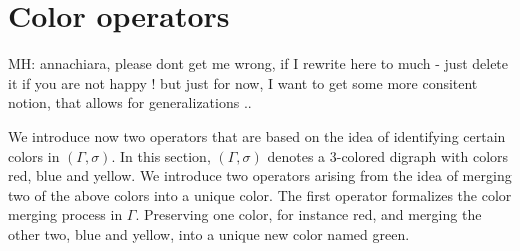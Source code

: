\documentclass[final,3p,times]{elsarticle}
\newcommand{\TODO}[1]{\begingroup\color{red}#1\endgroup}
\newcommand{\OLD}[1]{\begingroup\tiny\color{gray}#1\endgroup}
\newcommand{\mh}[1]{\begingroup\color{magenta}#1\endgroup}
\begin{document}
\section{Color operators}
\label{sec:operators}
\TODO{MH: annachiara, please dont get me wrong, if I rewrite here to much - just delete it if you are not 
happy ! but just for now, I want to get some more consitent notion, that allows for generalizations .. }

\mh{
We introduce now two operators that are based on the idea of identifying certain colors in  $(\Gamma,\sigma)$.
}
\OLD{In this section, $(\Gamma,\sigma)$ denotes a 3-colored digraph with colors red, blue and yellow. 
We introduce two operators arising from the idea of merging two of the above colors into a unique color. The first operator formalizes the color merging process in $\Gamma$. Preserving one color, for instance red, and merging the other two, blue and yellow, into a unique new color named green.}
\end{document}
